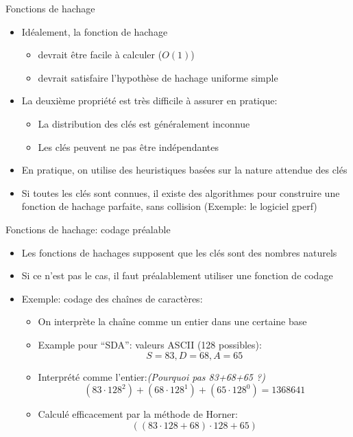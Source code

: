 \begin{frame}{Fonctions de hachage}
\begin{itemize}
\item Idéalement, la fonction de hachage
\begin{itemize}
\item devrait être facile à calculer ($O(1)$)
\item devrait satisfaire l'hypothèse de hachage uniforme simple
\end{itemize}
\item La deuxième propriété est très difficile à assurer en pratique:
\begin{itemize}
\item La distribution des clés est généralement inconnue
\item Les clés peuvent ne pas être indépendantes
\end{itemize}
\item En pratique, on utilise des heuristiques basées sur la nature
  attendue des clés
\item Si toutes les clés sont connues, il existe des algorithmes pour
  construire une fonction de hachage parfaite, sans collision
  (Exemple: le logiciel gperf)
\end{itemize}

\end{frame}

\begin{frame}{Fonctions de hachage: codage préalable}

\begin{itemize}
\item Les fonctions de hachages supposent que les clés sont des nombres naturels
\item Si ce n'est pas le cas, il faut préalablement utiliser une \alert{fonction de codage}
\item Exemple: codage des chaînes de caractères:
\begin{itemize}
\item On interprète la chaîne comme un entier dans une certaine base
\item Example pour ``SDA'': valeurs ASCII (128 possibles): $$S=83, D=68, A=65$$
\item Interprété comme l'entier:\hfill {\it (Pourquoi pas 83+68+65 ?)}
 $$(83\cdot 128^2)+(68\cdot 128^1)+(65\cdot 128^0)=1368641$$
\item Calculé efficacement par la méthode de Horner:
$$((83\cdot 128+68)\cdot 128 + 65)$$
\end{itemize}
\end{itemize}
\end{frame}

